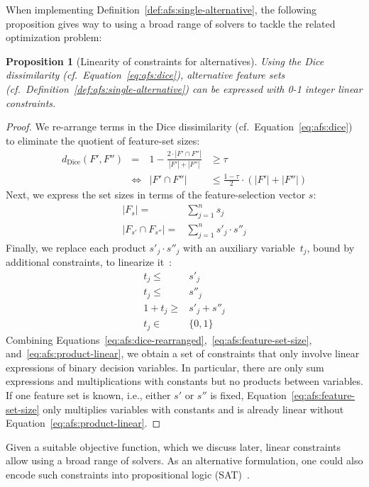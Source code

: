 \documentclass{article}
\newtheorem{proposition}{Proposition}
\theoremstyle{definition}
\begin{document}
When implementing Definition~\ref{def:afs:single-alternative}, the following proposition gives way to using a broad range of solvers to tackle the related optimization problem:
%
\begin{proposition}[Linearity of constraints for alternatives]
	Using the Dice dissimilarity (cf.~Equation~\ref{eq:afs:dice}), alternative feature sets (cf.~Definition~\ref{def:afs:single-alternative}) can be expressed with 0-1 integer linear constraints.
	\label{prop:afs:linear-constraints}
\end{proposition}
%
\begin{proof}
We re-arrange terms in the Dice dissimilarity (cf.~Equation~\ref{eq:afs:dice}) to eliminate the quotient of feature-set sizes:
%
\begin{equation}
	\begin{aligned}
		d_{\text{Dice}}(F',F'') &= & 1 - \frac{2 \cdot |F' \cap F''|}{|F'| + |F''|} &\geq \tau \\
		&\Leftrightarrow & |F' \cap F''| &\leq \frac{1 - \tau}{2} \cdot (|F'| + |F''|)
	\end{aligned}
	\label{eq:afs:dice-rearranged}
\end{equation}
%
Next, we express the set sizes in terms of the feature-selection vector $s$:
%
\begin{equation}
	\begin{aligned}
		|F_s| =& \sum_{j=1}^n s_j \\
		|F_{s'} \cap F_{s''}| =& \sum_{j=1}^n s'_j \cdot s''_j
	\end{aligned}
	\label{eq:afs:feature-set-size}
\end{equation}
%
Finally, we replace each product $s'_j \cdot s''_j$ with an auxiliary variable~$t_j$, bound by additional constraints, to linearize it~\cite{mosek2022modeling}:
%
\begin{equation}
	\begin{aligned}
		t_j \leq& s'_j \\
		t_j \leq& s''_j \\
		1 + t_j \geq& s'_j + s''_j \\
		t_j \in& \{0,1\}
	\end{aligned}
	\label{eq:afs:product-linear}
\end{equation}
%
Combining Equations~\ref{eq:afs:dice-rearranged},~\ref{eq:afs:feature-set-size}, and~\ref{eq:afs:product-linear}, we obtain a set of constraints that only involve linear expressions of binary decision variables.
In particular, there are only sum expressions and multiplications with constants but no products between variables.
If one feature set is known, i.e., either $s'$ or $s''$ is fixed, Equation~\ref{eq:afs:feature-set-size} only multiplies variables with constants and is already linear without Equation~\ref{eq:afs:product-linear}.
\end{proof}
%
Given a suitable objective function, which we discuss later, linear constraints allow using a broad range of solvers.
As an alternative formulation, one could also encode such constraints into propositional logic (\textsc{SAT})~\cite{ulrich2022selecting}.
\end{document}
